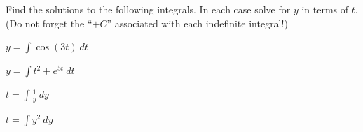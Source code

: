 


\begin{problem}
\item Find the solutions to the following integrals. In each case
  solve for $y$ in terms of $t$. (Do not forget the ``$+C$''
  associated with each indefinite integral!)
  \begin{subproblem}
    \item $y = \int \cos(3t) ~ dt$
      \vfill
    \item $y = \int t^2 + e^{5t} ~ dt$
      \vfill
    \item $t = \int \frac{1}{y} ~ dy$
      \vfill
    \item $t = \int y^2 ~ dy$
      \vfill
  \end{subproblem}  
\end{problem}


